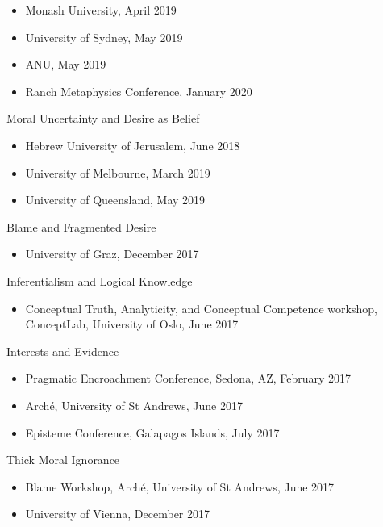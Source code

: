 \documentclass[
  10pt,
  letterpaper,
  DIV=11,
  numbers=noendperiod,
  twoside]{scrartcl}
\providecommand{\tightlist}{%
  \setlength{\itemsep}{0pt}\setlength{\parskip}{0pt}}
\begin{document}
\begin{itemize}
\tightlist
\item
  Monash University, April 2019
\item
  University of Sydney, May 2019
\item
  ANU, May 2019
\item
  Ranch Metaphysics Conference, January 2020
\end{itemize}

Moral Uncertainty and Desire as Belief

\begin{itemize}
\tightlist
\item
  Hebrew University of Jerusalem, June 2018
\item
  University of Melbourne, March 2019
\item
  University of Queensland, May 2019
\end{itemize}

Blame and Fragmented Desire

\begin{itemize}
\tightlist
\item
  University of Graz, December 2017
\end{itemize}

\newpage

Inferentialism and Logical Knowledge

\begin{itemize}
\tightlist
\item
  Conceptual Truth, Analyticity, and Conceptual Competence workshop,
  ConceptLab, University of Oslo, June 2017
\end{itemize}

Interests and Evidence

\begin{itemize}
\tightlist
\item
  Pragmatic Encroachment Conference, Sedona, AZ, February 2017
\item
  Arché, University of St Andrews, June 2017
\item
  Episteme Conference, Galapagos Islands, July 2017
\end{itemize}

Thick Moral Ignorance

\begin{itemize}
\tightlist
\item
  Blame Workshop, Arché, University of St Andrews, June 2017
\item
  University of Vienna, December 2017
\end{itemize}
\end{document}
